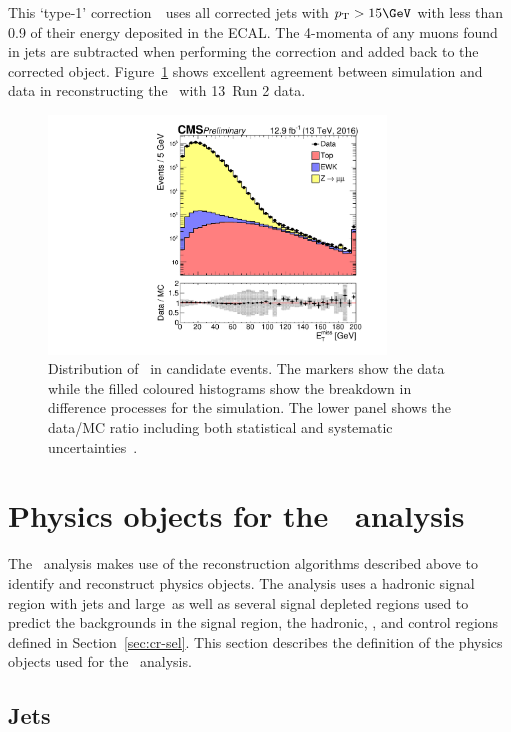 This `type-1' correction~\cite{met_fig}~uses all corrected jets with $\pt > 15\GeV$ with less than 0.9 of their energy deposited in the ECAL.
The 4-momenta of any muons found in jets are subtracted when performing the correction and added back to the corrected object.
Figure~\ref{fig:met_fig} shows excellent agreement between simulation and data
in reconstructing the \met~with 13\TeV~Run 2 data.

\begin{figure}
\centering
    \includegraphics[width=0.8\textwidth]{./Figures/reconstruction/met_fig.pdf}
  \caption{Distribution of \met~in \zmumu candidate events. The markers show the data while the filled coloured histograms
  show the breakdown in difference processes for the simulation. The lower panel shows the data/MC ratio including
  both statistical and systematic uncertainties~\cite{met_fig}. \label{fig:met_fig} 
}
\end{figure}

\section{Physics objects for the \alphat~analysis}

The \alphat~analysis makes use of the reconstruction algorithms described above
to identify and reconstruct physics objects. The analysis uses a hadronic signal 
region with jets and large~\met as well as several signal depleted regions used to predict the
backgrounds in the signal region, the hadronic, \gj, \mj and \mmj control regions defined in 
Section~\ref{sec:cr-sel}. This section describes the definition of the 
physics objects used for the \alphat~analysis.

\label{sec:phys-obj}
\subsection{Jets}


